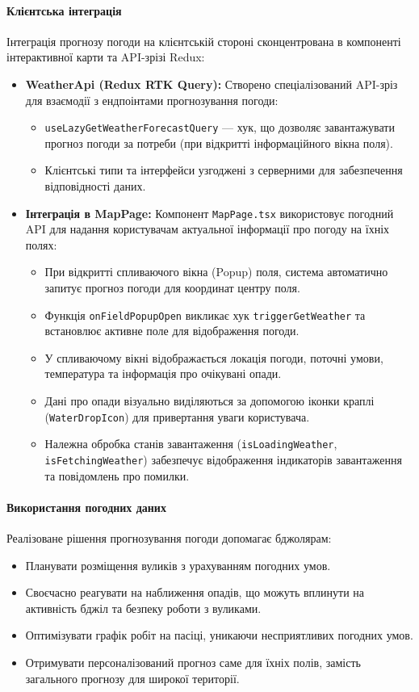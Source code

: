 \paragraph{Клієнтська інтеграція}
Інтеграція прогнозу погоди на клієнтській стороні сконцентрована в компоненті інтерактивної карти та API-зрізі Redux:

\begin{itemize}
    \item \textbf{WeatherApi (Redux RTK Query):} Створено спеціалізований API-зріз для взаємодії з ендпоінтами прогнозування погоди:
    \begin{itemize}
        \item \texttt{useLazyGetWeatherForecastQuery} — хук, що дозволяє завантажувати прогноз погоди за потреби (при відкритті інформаційного вікна поля).
        \item Клієнтські типи та інтерфейси узгоджені з серверними для забезпечення відповідності даних.
    \end{itemize}
    
    \item \textbf{Інтеграція в MapPage:} Компонент \texttt{MapPage.tsx} використовує погодний API для надання користувачам актуальної інформації про погоду на їхніх полях:
    \begin{itemize}
        \item При відкритті спливаючого вікна (Popup) поля, система автоматично запитує прогноз погоди для координат центру поля.
        \item Функція \texttt{onFieldPopupOpen} викликає хук \texttt{triggerGetWeather} та встановлює активне поле для відображення погоди.
        \item У спливаючому вікні відображається локація погоди, поточні умови, температура та інформація про очікувані опади.
        \item Дані про опади візуально виділяються за допомогою іконки краплі (\texttt{WaterDropIcon}) для привертання уваги користувача.
        \item Належна обробка станів завантаження (\texttt{isLoadingWeather}, \texttt{isFetchingWeather}) забезпечує відображення індикаторів завантаження та повідомлень про помилки.
    \end{itemize}
\end{itemize}

\paragraph{Використання погодних даних}
Реалізоване рішення прогнозування погоди допомагає бджолярам:
\begin{itemize}
    \item Планувати розміщення вуликів з урахуванням погодних умов.
    \item Своєчасно реагувати на наближення опадів, що можуть вплинути на активність бджіл та безпеку роботи з вуликами.
    \item Оптимізувати графік робіт на пасіці, уникаючи несприятливих погодних умов.
    \item Отримувати персоналізований прогноз саме для їхніх полів, замість загального прогнозу для широкої території.
\end{itemize}

